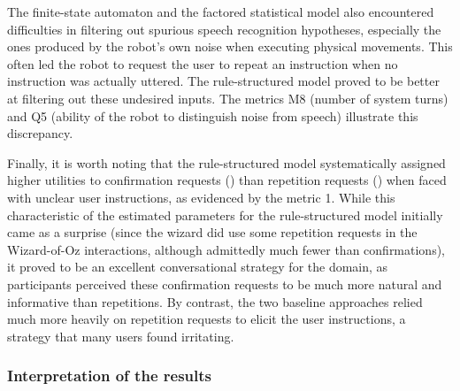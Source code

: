The finite-state automaton and the factored statistical model also encountered difficulties in filtering out spurious speech recognition hypotheses, especially the ones produced by the robot's own noise when executing physical movements.  This often led the robot to request the user to repeat an instruction when no instruction was actually uttered.  The rule-structured model proved to be better at filtering out these undesired inputs.  The metrics M8 (number of system turns) and Q5 (ability of the robot to distinguish noise from speech) illustrate this discrepancy. 

Finally, it is worth noting that the rule-structured model systematically assigned higher utilities to confirmation requests () than repetition requests () when faced with unclear user instructions, as evidenced by the metric 1. While this characteristic of the estimated parameters for the rule-structured model initially came as a surprise (since the wizard did use some repetition requests in the Wizard-of-Oz interactions, although admittedly much fewer than confirmations), it proved to be an excellent conversational strategy for the domain, as participants perceived these confirmation requests to be much more natural and informative than repetitions. By contrast, the two baseline approaches relied much more heavily on repetition requests to elicit the user instructions, a strategy that many users found irritating. 

\subsubsection*{Interpretation of the results}

